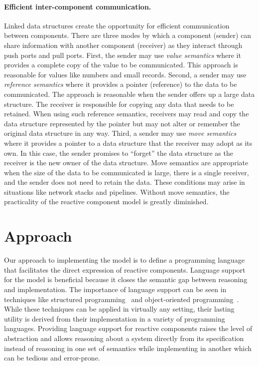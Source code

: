 \paragraph{Efficient inter-component communication.}
Linked data structures create the opportunity for efficient communication between components.
There are three modes by which a component (sender) can share information with another component (receiver) as they interact through push ports and pull ports.
First, the sender may use \emph{value semantics} where it provides a complete copy of the value to be communicated.
This approach is reasonable for values like numbers and small records.
Second, a sender may use \emph{reference semantics} where it provides a pointer (reference) to the data to be communicated.
The approach is reasonable when the sender offers up a large data structure.
The receiver is responsible for copying any data that needs to be retained.
When using such reference semantics, receivers may read and copy the data structure represented by the pointer but may not alter or remember the original data structure in any way.
Third, a sender may use \emph{move semantics} where it provides a pointer to a data structure that the receiver may adopt as its own.
In this case, the sender promises to ``forget'' the data structure as the receiver is the new owner of the data structure.
Move semantics are appropriate when the size of the data to be communicated is large, there is a single receiver, and the sender does not need to retain the data.
These conditions may arise in situations like network stacks and pipelines.
Without move semantics, the practicality of the reactive component model is greatly diminished.

\section{Approach}

Our approach to implementing the model is to define a programming language that facilitates the direct expression of reactive components.
Language support for the model is beneficial because it closes the semantic gap between reasoning and implementation.
The importance of language support can be seen in techniques like structured programming~\cite{dahl1972structured} and object-oriented programming~\cite{booch1982object}.
While these techniques can be applied in virtually any setting, their lasting utility is derived from their implementation in a variety of programming languages.
Providing language support for reactive components raises the level of abstraction and allows reasoning about a system directly from its specification instead of reasoning in one set of semantics while implementing in another which can be tedious and error-prone.

